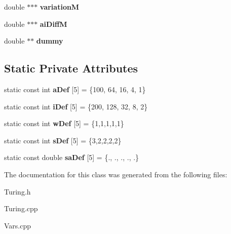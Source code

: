 \begin{DoxyCompactItemize}
\item 
\hypertarget{class_turing_aca854b9315a30392f7d8247d99cc917f}{double $\ast$$\ast$$\ast$ {\bfseries variation\+M}}\label{class_turing_aca854b9315a30392f7d8247d99cc917f}

\item 
\hypertarget{class_turing_af61d6d710eebac2c533263634305ee7c}{double $\ast$$\ast$$\ast$ {\bfseries ai\+Diff\+M}}\label{class_turing_af61d6d710eebac2c533263634305ee7c}

\item 
\hypertarget{class_turing_ac53bb0604b488efdb6438303bd3c481a}{double $\ast$$\ast$ {\bfseries dummy}}\label{class_turing_ac53bb0604b488efdb6438303bd3c481a}

\end{DoxyCompactItemize}
\subsection*{Static Private Attributes}
\begin{DoxyCompactItemize}
\item 
\hypertarget{class_turing_af9ae2c0aa54ca516c5787b6a06c1d173}{static const int {\bfseries a\+Def} \mbox{[}5\mbox{]} = \{100, 64, 16, 4, 1\}}\label{class_turing_af9ae2c0aa54ca516c5787b6a06c1d173}

\item 
\hypertarget{class_turing_a513d70f38cb2adeab2153737c9a06280}{static const int {\bfseries i\+Def} \mbox{[}5\mbox{]} = \{200, 128, 32, 8, 2\}}\label{class_turing_a513d70f38cb2adeab2153737c9a06280}

\item 
\hypertarget{class_turing_a90319b75d195ee274c04ae835c327bc2}{static const int {\bfseries w\+Def} \mbox{[}5\mbox{]} = \{1,1,1,1,1\}}\label{class_turing_a90319b75d195ee274c04ae835c327bc2}

\item 
\hypertarget{class_turing_a6b1d338641fd13916597a1408a38b546}{static const int {\bfseries s\+Def} \mbox{[}5\mbox{]} = \{3,2,2,2,2\}}\label{class_turing_a6b1d338641fd13916597a1408a38b546}

\item 
\hypertarget{class_turing_a5e8d7ff7e6fd3efd794d54c2dee3a20f}{static const double {\bfseries sa\+Def} \mbox{[}5\mbox{]} = \{., ., ., ., .\}}\label{class_turing_a5e8d7ff7e6fd3efd794d54c2dee3a20f}

\end{DoxyCompactItemize}


The documentation for this class was generated from the following files\+:\begin{DoxyCompactItemize}
\item 
Turing.\+h\item 
Turing.\+cpp\item 
Vars.\+cpp\end{DoxyCompactItemize}
